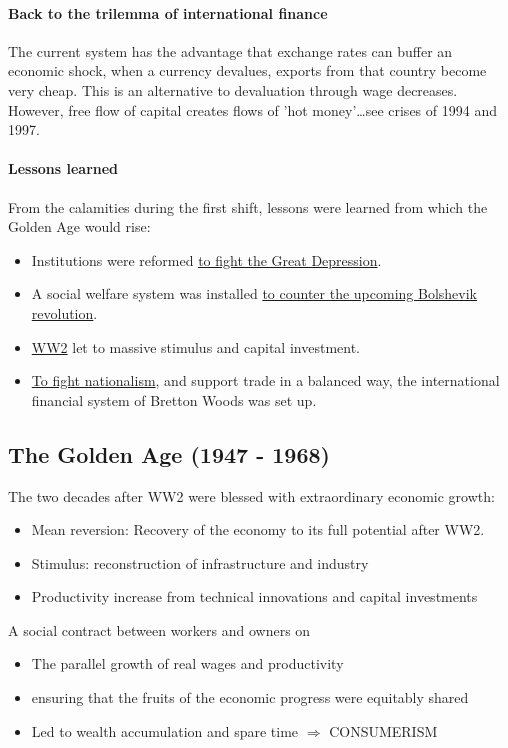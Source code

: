 \paragraph{Back to the trilemma of international finance}
The current system has the advantage that exchange rates can buffer an
economic shock, when a currency devalues, exports from that country become
very cheap. This is an alternative to devaluation through wage decreases.
However, free flow of capital creates flows of 'hot money'\dots see crises
of 1994 and 1997.

\paragraph{Lessons learned}

From the calamities during the first shift, lessons were learned from which
the Golden Age would rise:

\begin{itemize}
    \item Institutions were reformed \underline{to fight the Great Depression}.
    \item A social welfare system was installed \underline{to counter the
        upcoming Bolshevik revolution}.
    \item \underline{WW2} let to massive stimulus and capital investment.
    \item \underline{To fight nationalism}, and support trade in a balanced
        way, the international financial system of Bretton Woods was set up.
\end{itemize}


\subsection{The Golden Age (1947 - 1968)}

The two decades after WW2 were blessed with extraordinary economic growth:
\begin{itemize}
    \item Mean reversion: Recovery of the economy to its full potential
        after WW2.
    \item Stimulus: reconstruction of infrastructure and industry
    \item Productivity increase from technical innovations and capital
        investments
\end{itemize}

A social contract between workers and owners on
\begin{itemize}
    \item The parallel growth of real wages and productivity
    \item ensuring that the fruits of the economic progress were equitably
        shared
    \item Led to wealth accumulation and spare time $\Rightarrow$ CONSUMERISM
\end{itemize}

